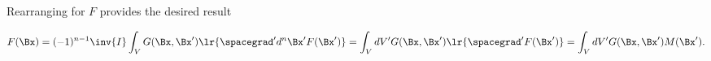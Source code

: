 Rearranging for \( F \) provides the desired result

\begin{dmath}\label{eqn:gradientGreensFunctionProof:280}
F(\Bx)
=
(-1)^{n-1} \inv{I}
\int_V G(\Bx,\Bx') \lr{ \spacegrad' d^n \Bx' F(\Bx') }
=
\int_V dV' G(\Bx,\Bx') \lr{ \spacegrad' F(\Bx') }
=
\int_V dV' G(\Bx,\Bx') M(\Bx').
\end{dmath}
